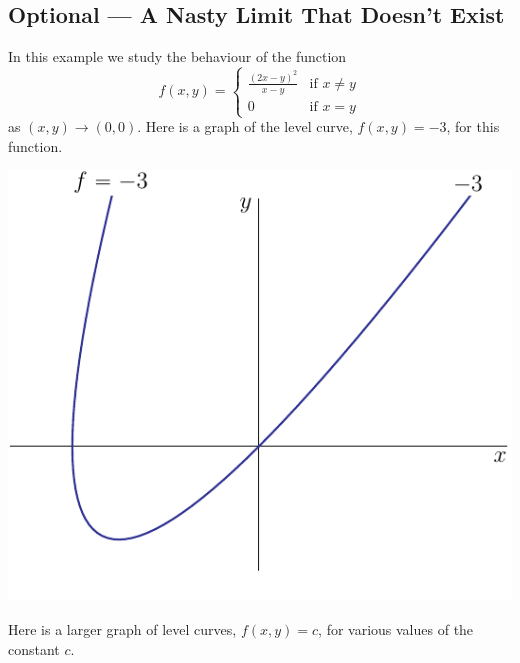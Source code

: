 \subsection{Optional --- A Nasty Limit That Doesn't Exist}
\begin{eg}\label{eg nasty limit}
In this example we study the behaviour of the function
$$
f(x,y)=\begin{cases}
      \frac{(2x-y)^2}{x-y} & \text{if $x\ne y$}\\[0.05in]
                  0 & \text{if $x=y$}
        \end{cases}
$$ 
as $(x,y)\rightarrow (0,0)$.
Here is a graph of the level curve, $f(x,y)=-3$, for this function.
\begin{efig}
\begin{center}
   \includegraphics[scale=0.8]{noLimS.pdf}
\end{center}
\end{efig}
Here is a larger graph of level curves, $f(x,y)=c$, for 
various values of the constant $c$.
\begin{efig}
\begin{center}

\end{center}
\end{efig}
\end{eg}

